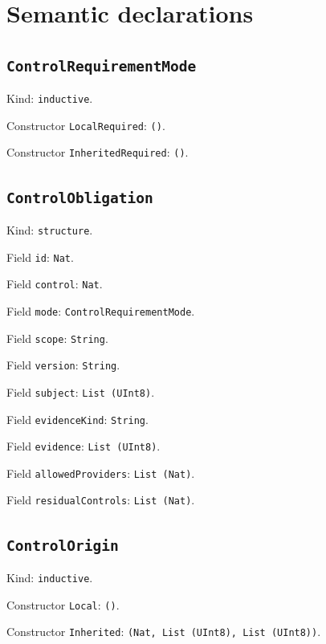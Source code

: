 \documentclass[11pt]{article}
\begin{document}
\section*{Semantic declarations}
\subsection*{\texttt{ControlRequirementMode}}
\noindent Kind: \texttt{inductive}.\par
\noindent Constructor \texttt{LocalRequired}: \texttt{()}.\par
\noindent Constructor \texttt{InheritedRequired}: \texttt{()}.\par
\subsection*{\texttt{ControlObligation}}
\noindent Kind: \texttt{structure}.\par
\noindent Field \texttt{id}: \texttt{Nat}.\par
\noindent Field \texttt{control}: \texttt{Nat}.\par
\noindent Field \texttt{mode}: \texttt{ControlRequirementMode}.\par
\noindent Field \texttt{scope}: \texttt{String}.\par
\noindent Field \texttt{version}: \texttt{String}.\par
\noindent Field \texttt{subject}: \texttt{List (UInt8)}.\par
\noindent Field \texttt{evidenceKind}: \texttt{String}.\par
\noindent Field \texttt{evidence}: \texttt{List (UInt8)}.\par
\noindent Field \texttt{allowedProviders}: \texttt{List (Nat)}.\par
\noindent Field \texttt{residualControls}: \texttt{List (Nat)}.\par
\subsection*{\texttt{ControlOrigin}}
\noindent Kind: \texttt{inductive}.\par
\noindent Constructor \texttt{Local}: \texttt{()}.\par
\noindent Constructor \texttt{Inherited}: \texttt{(Nat, List (UInt8), List (UInt8))}.\par
\end{document}

